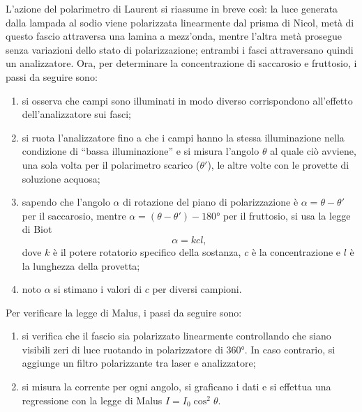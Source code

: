 L'azione del polarimetro di Laurent si riassume in breve così: la luce generata dalla lampada al sodio viene polarizzata linearmente dal prisma di Nicol, metà di questo fascio attraversa una lamina a mezz'onda, mentre l'altra metà prosegue senza variazioni dello stato di polarizzazione; entrambi i fasci attraversano quindi un analizzatore. Ora, per determinare la concentrazione di saccarosio e fruttosio, i passi da seguire sono:
\begin{enumerate}
    \item si osserva che campi sono illuminati in modo diverso corrispondono all'effetto dell'analizzatore sui fasci;
    \item si ruota l'analizzatore fino a che i campi hanno la stessa illuminazione nella condizione di ``bassa illuminazione'' e si misura l'angolo $\theta$ al quale ciò avviene, una sola volta per il polarimetro scarico ($\theta'$), le altre volte con le provette di soluzione acquosa;
    \item sapendo che l'angolo $\alpha$ di rotazione del piano di polarizzazione è $\alpha=\theta-\theta'$ per il saccarosio, mentre $\alpha=(\theta-\theta')-\ang{180}$ per il fruttosio, si usa la legge di Biot
    \begin{equation}
        \label{eq: legge di biot}
        \alpha=kcl,
    \end{equation}
    dove $k$ è il potere rotatorio specifico della sostanza, $c$ è la concentrazione e $l$ è la lunghezza della provetta;
    \item noto $\alpha$ si stimano i valori di $c$ per diversi campioni.
\end{enumerate}
Per verificare la legge di Malus, i passi da seguire sono:
\begin{enumerate}
    \item si verifica che il fascio sia polarizzato linearmente controllando che siano visibili zeri di luce ruotando in polarizzatore di 360°. In caso contrario, si aggiunge un filtro polarizzante tra laser e analizzatore;
    \item si misura la corrente per ogni angolo, si graficano i dati e si effettua una regressione con la legge di Malus $I=I_0\cos^2{\theta}$.
\end{enumerate}

